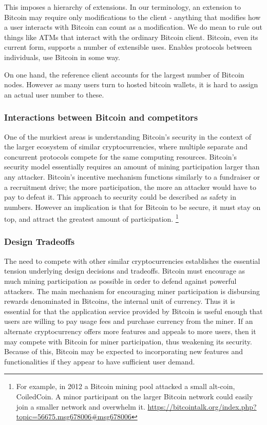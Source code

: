 This imposes a hierarchy of extensions. In our terminology, an extension to Bitcoin may require only modifications to the client - anything that modifies how a user interacts with Bitcoin can count as a modification. We do mean to rule out things like ATMs that interact with the ordinary Bitcoin client. Bitcoin, even its current form, supports a number of extensible uses. Enables protocols between individuals, use Bitcoin in some way.

On one hand, the reference client accounts for the largest number of Bitcoin nodes. However as many users turn to hosted bitcoin wallets, it is hard to assign an actual user number to these.

\subsubsection{Interactions between Bitcoin and competitors}
One of the murkiest areas is understanding Bitcoin's security in the context of the larger ecosystem of similar cryptocurrencies, where multiple separate and concurrent protocols compete for the same computing resources. Bitcoin's security model essentially requires an amount of mining participation larger than any attacker. Bitcoin's incentive mechanism functions similarly to a fundraiser or a recruitment drive; the more participation, the more an attacker would have to pay to defeat it. This approach to security could be described as safety in numbers. However an implication is that for Bitcoin to be secure, it must stay on top, and attract the greatest amount of participation. \footnote{For example, in 2012 a Bitcoin mining pool attacked a small alt-coin, CoiledCoin. A minor participant on the larger Bitcoin network could easily join a smaller network and overwhelm it. \url{https://bitcointalk.org/index.php?topic=56675.msg678006#msg678006}}

\subsubsection{Design Tradeoffs}
The need to compete with other similar cryptocurrencies establishes the essential tension underlying design decisions and tradeoffs. Bitcoin must encourage as much mining participation as possible in order to defend against powerful attackers. The main mechanism for encouraging miner participation is disbursing rewards denominated in Bitcoins, the internal unit of currency. Thus it is essential for that the application service provided by Bitcoin is useful enough that users are willing to pay usage fees and purchase currency from the miner. If an alternate cryptocurrency offers more features and appeals to more users, then it may compete with Bitcoin for miner participation, thus weakening its security. Because of this, Bitcoin may be expected to incorporating new features and functionalities if they appear to have sufficient user demand.

